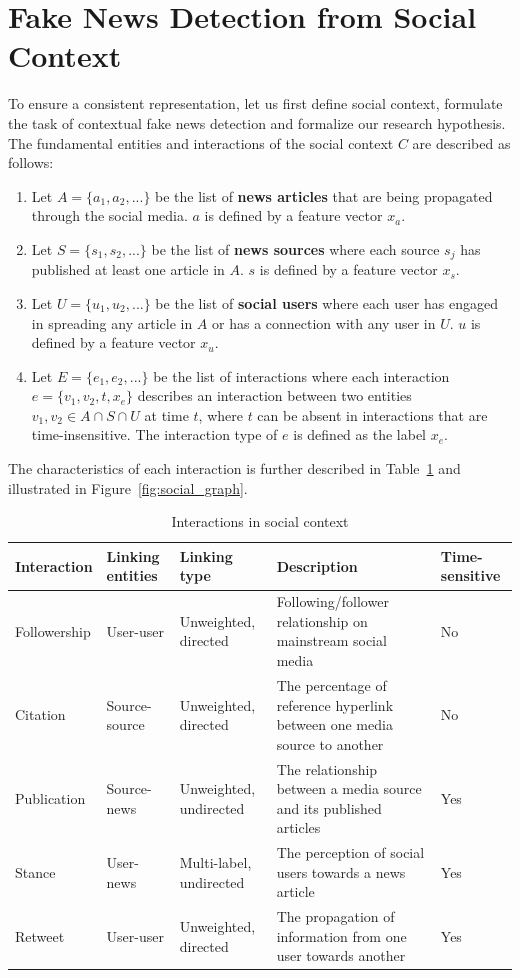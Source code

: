 \documentclass[fyp]{socreport}
\theoremstyle{definition}
\theoremstyle{hypothesis}
\begin{document}
\section{Fake News Detection from Social Context}
To ensure a consistent representation, let us first define social context, formulate the task of contextual fake news detection and formalize our research hypothesis. The fundamental entities and interactions of the social context $C$ are described as follows: 
\begin{enumerate}
    \item Let $A=\{a_1, a_2,...\}$ be the list of \textbf{news articles} that are being propagated through the social media. $a$ is defined by a feature vector $x_{a}$.
    \item Let $S=\{s_1, s_2,...\}$ be the list of \textbf{news sources} where each source $s_j$ has published at least one article in $A$. $s$ is defined by a feature vector $x_{s}$.
    \item Let $U=\{u_1, u_2,...\}$ be the list of \textbf{social users} where each user has engaged in spreading any article in $A$ or has a connection with any user in $U$. $u$ is defined by a feature vector $x_{u}$.
    \item Let $E=\{e_1, e_2,...\}$ be the list of interactions where each interaction $e=\{v_1, v_2, t, x_e\}$ describes an interaction between two entities $v_1, v_2\in A\cap S\cap U$ at time $t$, where $t$ can be absent in interactions that are time-insensitive. The interaction type of $e$ is defined as the label $x_{e}$.
\end{enumerate}
The characteristics of each interaction is further described in Table~\ref{table:social_interactions} and illustrated in Figure~\ref{fig:social_graph}.

\begin{table}[t]
  \centering
  \tiny
  \begin{tabular}{|p{1.5cm}|p{2cm}|p{2.5cm}|p{5cm}|p{1cm}|}
    \hline
    Interaction & Linking entities & Linking type & Description & Time-sensitive \\ \hline \hline
    Followership & User-user & Unweighted, directed & Following/follower relationship on mainstream social media & No \\ \hline
    Citation & Source-source & Unweighted, directed & The percentage of reference hyperlink between one media source to another & No \\ \hline
    Publication & Source-news & Unweighted, undirected & The relationship between a media source and its published articles & Yes \\ \hline
    Stance & User-news & Multi-label, undirected & The perception of social users towards a news article & Yes \\ \hline
    Retweet & User-user & Unweighted, directed & The propagation of information from one user towards another & Yes \\ \hline 
  \end{tabular}
  \caption{Interactions in social context}
  \label{table:social_interactions}
\end{table}
\end{document}
